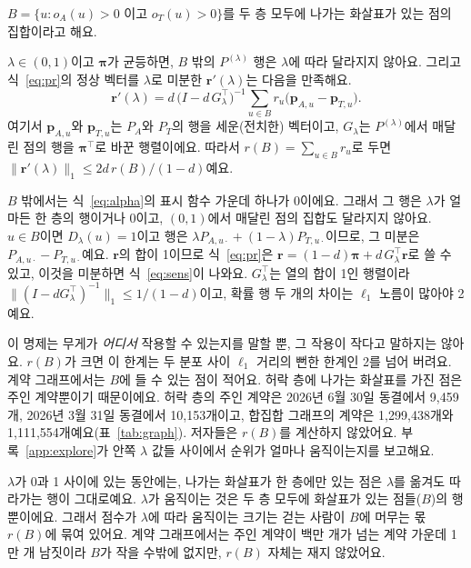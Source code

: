 $B=\{u: o_A(u)>0 \text{ 이고 } o_T(u)>0\}$를 두 층 모두에 나가는 화살표가 있는 점의 집합이라고 해요.

\begin{proposition}
\label{prop:localize}
$\lambda\in(0,1)$이고 $\boldsymbol\pi$가 균등하면, $B$ 밖의 $P^{(\lambda)}$ 행은 $\lambda$에 따라 달라지지 않아요. 그리고 식~\eqref{eq:pr}의 정상 벡터를 $\lambda$로 미분한 $\mathbf r'(\lambda)$는 다음을 만족해요.
\begin{equation}
\mathbf r'(\lambda)=d\,\bigl(I-d\,G_\lambda^{\top}\bigr)^{-1}\sum_{u\in B} r_u\bigl(\mathbf p_{A,u}-\mathbf p_{T,u}\bigr).
\label{eq:sens}
\end{equation}
여기서 $\mathbf p_{A,u}$와 $\mathbf p_{T,u}$는 $P_A$와 $P_T$의 행을 세운(전치한) 벡터이고, $G_\lambda$는 $P^{(\lambda)}$에서 매달린 점의 행을 $\boldsymbol\pi^{\top}$로 바꾼 행렬이에요. 따라서 $r(B)=\sum_{u\in B}r_u$로 두면 $\|\mathbf r'(\lambda)\|_1\le 2d\,r(B)/(1-d)$예요.
\end{proposition}

\begin{proofko}
$B$ 밖에서는 식~\eqref{eq:alpha}의 표시 함수 가운데 하나가 0이에요. 그래서 그 행은 $\lambda$가 얼마든 한 층의 행이거나 0이고, $(0,1)$에서 매달린 점의 집합도 달라지지 않아요. $u\in B$이면 $D_\lambda(u)=1$이고 행은 $\lambda P_{A,u\cdot}+(1-\lambda)P_{T,u\cdot}$이므로, 그 미분은 $P_{A,u\cdot}-P_{T,u\cdot}$예요. $\mathbf r$의 합이 1이므로 식~\eqref{eq:pr}은 $\mathbf r=(1-d)\boldsymbol\pi+d\,G_\lambda^{\top}\mathbf r$로 쓸 수 있고, 이것을 미분하면 식~\eqref{eq:sens}이 나와요. $G_\lambda^{\top}$는 열의 합이 1인 행렬이라 $\|(I-dG_\lambda^{\top})^{-1}\|_1\le 1/(1-d)$이고, 확률 행 두 개의 차이는 $\ell_1$ 노름이 많아야 2예요.
\end{proofko}

이 명제는 무게가 \emph{어디서} 작용할 수 있는지를 말할 뿐, 그 작용이 작다고 말하지는 않아요. $r(B)$가 크면 이 한계는 두 분포 사이 $\ell_1$ 거리의 뻔한 한계인 2를 넘어 버려요. 계약 그래프에서는 $B$에 들 수 있는 점이 적어요. 허락 층에 나가는 화살표를 가진 점은 주인 계약뿐이기 때문이에요. 허락 층의 주인 계약은 2026년 6월 30일 동결에서 9,459개, 2026년 3월 31일 동결에서 10,153개이고, 합집합 그래프의 계약은 1,299,438개와 1,111,554개예요(표~\ref{tab:graph}). 저자들은 $r(B)$를 계산하지 않았어요. 부록~\ref{app:explore}가 안쪽 $\lambda$ 값들 사이에서 순위가 얼마나 움직이는지를 보고해요.

\begin{puri}
$\lambda$가 0과 1 사이에 있는 동안에는, 나가는 화살표가 한 층에만 있는 점은 $\lambda$를 옮겨도 따라가는 행이 그대로예요. $\lambda$가 움직이는 것은 두 층 모두에 화살표가 있는 점들($B$)의 행뿐이에요. 그래서 점수가 $\lambda$에 따라 움직이는 크기는 걷는 사람이 $B$에 머무는 몫 $r(B)$에 묶여 있어요. 계약 그래프에서는 주인 계약이 백만 개가 넘는 계약 가운데 1만 개 남짓이라 $B$가 작을 수밖에 없지만, $r(B)$ 자체는 재지 않았어요.
\end{puri}

